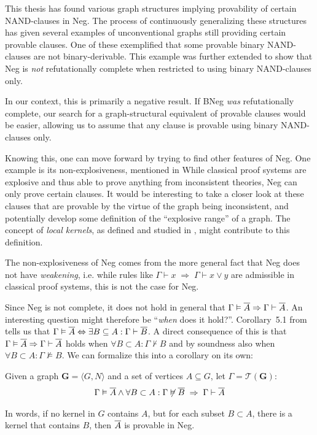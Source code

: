 This thesis has found various graph structures implying provability of certain NAND-clauses in Neg.
The process of continuously generalizing these structures has given several examples of unconventional graphs still providing certain provable clauses.
One of these exemplified that some provable binary NAND-clauses are not binary-derivable.
This example was further extended to show that Neg is \textit{not} refutationally complete when restricted to using binary NAND-clauses only.

In our context, this is primarily a negative result.
If BNeg \textit{was} refutationally complete, our search for a graph-structural equivalent of provable clauses would be easier, allowing us to assume that any clause is provable using binary NAND-clauses only.

Knowing this, one can move forward by trying to find other features of Neg.
One example is its non-explosiveness, mentioned in \cite{michal-completeness}
While classical proof systems are explosive and thus able to prove anything from inconsistent theories, Neg can only prove certain clauses.
It would be interesting to take a closer look at these clauses that are provable by the virtue of the graph being inconsistent, and potentially develop some definition of the ``explosive range'' of a graph.
The concept of \textit{local kernels}, as defined and studied in \cite{synthese-pdl}, might contribute to this definition.

The non-explosiveness of Neg comes from the more general fact that Neg does not have \textit{weakening}, i.e. while rules like $\Gamma \vdash x \; \Rightarrow \; \Gamma \vdash x \vee y$ are admissible in classical proof systems, this is not the case for Neg.

Since Neg is not complete, it does not hold in general that $\Gamma \vDash \ol{A} \Rightarrow \Gamma \vdash \ol{A}$.
An interesting question might therefore be ``\textit{when} does it hold?''.
Corollary~5.1 from \cite{michal-completeness} tells us that $\Gamma \vDash \ol{A} \Leftrightarrow \exists B \subseteq A: \Gamma \vdash \ol{B}$.
A direct consequence of this is that $\Gamma \vDash \ol{A} \Rightarrow \Gamma \vdash \ol{A}$ holds when $\forall B \subset A: \Gamma \not\vdash B$ and by soundness also when $\forall B \subset A: \Gamma \not\vDash B$.
We can formalize this into a corollary on its own:
\begin{corollary}
  Given a graph $\mathbf{G} = \langle G,N \rangle$ and a set of vertices $A \subseteq G$, let $\Gamma = \mathcal{T}(\mathbf{G})$:
  \begin{align}
    \Gamma \vDash \ol{A} \wedge \forall B \subset A: \Gamma \not\vDash \ol{ B } \;\Rightarrow \; \Gamma \vdash \ol{A}
  \end{align}
\end{corollary}
In words, if no kernel in $G$ contains $A$, but for each subset $B \subset A$, there is a kernel that contains $B$, then $\ol{A}$ is provable in Neg.


